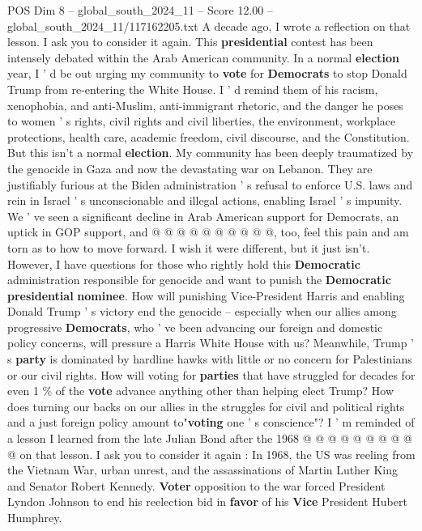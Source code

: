 \begin{textsample}{POS Dim 8 – global\_south\_2024\_11 – Score 12.00 – global\_south\_2024\_11/117162205.txt}  \label{ex:f8_pos_141}
A decade ago, I wrote a reflection on that lesson.
I ask you to consider it again.
This \textbf{presidential} contest has been intensely debated within the Arab American community.
In a normal \textbf{election} year, I ' d be out urging my community to \textbf{vote} for \textbf{Democrats} to stop Donald Trump from re-entering the White House.
I ' d remind them of his racism, xenophobia, and anti-Muslim, anti-immigrant rhetoric, and the danger he poses to women ' s rights, civil rights and civil liberties, the environment, workplace protections, health care, academic freedom, civil discourse, and the Constitution.
But this isn't a normal \textbf{election}.
My community has been deeply traumatized by the genocide in Gaza and now the devastating war on Lebanon.
They are justifiably furious at the Biden administration ' s refusal to enforce U.S. laws and rein in Israel ' s unconscionable and illegal actions, enabling Israel ' s impunity.
We ' ve seen a significant decline in Arab American support for Democrats, an uptick in GOP support, and @ @ @ @ @ @ @ @ @ @, too, feel this pain and am torn as to how to move forward.
I wish it were different, but it just isn't.
However, I have questions for those who rightly hold this \textbf{Democratic} administration responsible for genocide and want to punish the \textbf{Democratic} \textbf{presidential} \textbf{nominee}.
How will punishing Vice-President Harris and enabling Donald Trump ' s victory end the genocide -- especially when our allies among progressive \textbf{Democrats}, who ' ve been advancing our foreign and domestic policy concerns, will pressure a Harris White House with us?
Meanwhile, Trump ' s \textbf{party} is dominated by hardline hawks with little or no concern for Palestinians or our civil rights.
How will voting for \textbf{parties} that have struggled for decades for even 1 \% of the \textbf{vote} advance anything other than helping elect Trump?
How does turning our backs on our allies in the struggles for civil and political rights and a just foreign policy amount to"\textbf{voting} one ' s conscience"?
I ' m reminded of a lesson I learned from the late Julian Bond after the 1968 @ @ @ @ @ @ @ @ @ @ on that lesson.
I ask you to consider it again : In 1968, the US was reeling from the Vietnam War, urban unrest, and the assassinations of Martin Luther King and Senator Robert Kennedy. \textbf{Voter} opposition to the war forced President Lyndon Johnson to end his reelection bid in \textbf{favor} of his \textbf{Vice} President Hubert Humphrey.

\end{textsample}
